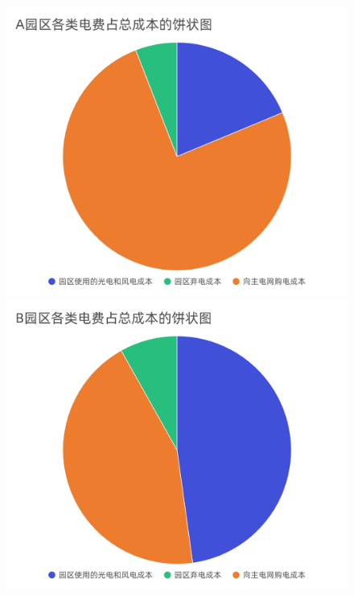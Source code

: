 \documentclass{cumcmthesis}
\begin{document}
\begin{figure}[!h]  
\centering  
\begin{minipage}{.5\textwidth}  
  \centering  
  \includegraphics[width=.9\linewidth]{figures/A饼图.pdf}  
\end{minipage}%
\begin{minipage}{.5\textwidth}  
  \centering  
  \includegraphics[width=.9\linewidth]{figures/B饼图.jpg}  
\end{minipage}  
\begin{minipage}{.5\textwidth}  
  \centering  

\end{minipage}
\end{figure}
\end{document}
